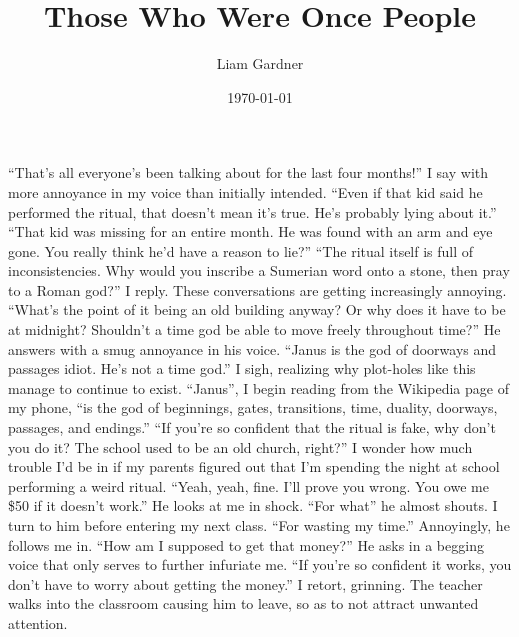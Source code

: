 \documentclass[a4paper, 12pt]{book}
\title{Those Who Were Once People}
\author{Liam Gardner}
\date{\today}
\newcommand\tab[1][1cm]{\hspace*{#1}}
\begin{document}
\newcommand{\AmaGi}{$\stackrel{\hbox{\fontsize{15}{60}\selectfont ama-gi}}{\hbox{\fontsize{30}{60}\selectfont {\symbol{"120BC}\symbol{"12104}}}}$}
\maketitle
\tab
“That’s all everyone’s been talking about for the last four months!” I say with more annoyance in my voice than initially intended. “Even if that kid said he performed the ritual, that doesn’t mean it’s true. He’s probably lying about it.”
\newline
\tab
“That kid was missing for an entire month. He was found with an arm and eye gone. You really think he’d have a reason to lie?” 
\newline
\tab
“The ritual itself is full of inconsistencies. Why would you inscribe a Sumerian word onto a stone, then pray to a Roman god?” I reply. These conversations are getting increasingly annoying. “What’s the point of it being an old building anyway? Or why does it have to be at midnight? Shouldn’t a time god be able to move freely throughout time?”
\newline
\tab
He answers with a smug annoyance in his voice. “Janus is the god of doorways and passages idiot. He’s not a time god.”
\newline
\tab
I sigh, realizing why plot-holes like this manage to continue to exist. “Janus”, I begin reading from the Wikipedia page of my phone, “is the god of beginnings, gates, transitions, time, duality, doorways, passages, and endings.”
\newline
\tab
“If you’re so confident that the ritual is fake, why don’t you do it? The school used to be an old church, right?”
\newline
\tab
I wonder how much trouble I’d be in if my parents figured out that I’m spending the night at school performing a weird ritual. “Yeah, yeah, fine. I’ll prove you wrong. You owe me \$50 if it doesn’t work.”
\newline
\tab
He looks at me in shock. “For what\textinterrobang” he almost shouts.
\newline
\tab
I turn to him before entering my next class. “For wasting my time.”
\newline
\tab
Annoyingly, he follows me in. “How am I supposed to get that money?” He asks in a begging voice that only serves to further infuriate me.
\newline
\tab
“If you’re so confident it works, you don’t have to worry about getting the money.” I retort, grinning. The teacher walks into the classroom causing him to leave, so as to not attract unwanted attention. 
\end{document}
